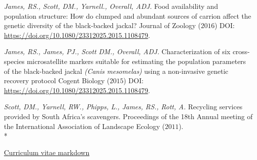 \documentclass[hidelinks]{james-cv} %
\begin{document}
\begin{reflist}
\ent
\textit{James, RS., Scott, DM., Yarnell., Overall, ADJ. } {Food availability and population structure: How do clumped and abundant sources of carrion affect the genetic diversity of the black‐backed jackal? } {Journal of Zoology \color{gray}($2016$) \bodyfontsc DOI: \thinfont\color{blue}\href{https://www.tandfonline.com/doi/full/10.1080/23312025.2015.1108479}{https://doi.org/10.1080/23312025.2015.1108479}.}

\ent
\textit{James, RS., James, PJ., Scott DM., Overall, ADJ. } {Characterization of six cross-species microsatellite markers suitable for estimating the population parameters of the black-backed jackal \textit{(Canis mesomelas)} \textrm using a non-invasive genetic recovery protocol } {Cogent Biology \color{gray}($2015$) \bodyfontsc DOI: \thinfont\color{blue}\href{https://www.tandfonline.com/doi/full/10.1080/23312025.2015.1108479}{https://doi.org/10.1080/23312025.2015.1108479}.}

\ent
\textit{Scott, DM., Yarnell, RW., Phipps, L., James, RS., Rott, A.} { Recycling services provided by South Africa’s scavengers.} {Proceedings of the 18th Annual meeting of the International Association of Landscape Ecology \color{gray} ($2011$).}\\*

\end{reflist}

\hspace{-21.5\parskip}\thinfont\footnotesize\color{blue}\href{https://github.com/BadgerRob/CV_Typesetting_backup}{Curriculum vitae markdown}
\end{document}
